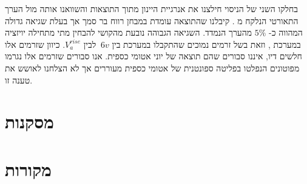 \documentclass{article}
\begin{document}
בחלקו השני של הניסוי חילצנו את אנרגיית היינון מתוך התוצאות והשוואנו אותה מול הערך התאורטי הנלקח מ
\cite{NIST_ASD}.
קיבלנו שהתוצאה עומדת במבחן רווח בר סמך אך בעלת שגיאה גדולה המהווה 
כ-
$5\%$
מהערך הנמדד.
השגיאה הגבוהה נובעת מהקושי להבחין מתי מתחילה יויזציה במערכת , וזאת בשל
 זרמים נמוכים שהתקבלו במערכת
בין 
$~ 6v$
לבין
$V_a^{rise}$.
כיוון שזרמים אלו חלשים דיו, איננו סבורים שהם תוצאה של יוני אטומי כספית. אנו סבורים שזרמים אלו נגרמו מפוטונים הנפלטו בפליטה ספונטנית של אטומי כספית מעוררים אך לא הצלחנו לאושש את טענה זו.

\section{מסקנות}


\section{מקורות}

\begin{english}
\printbibliography[heading=none]
\end{english}
\end{document}
